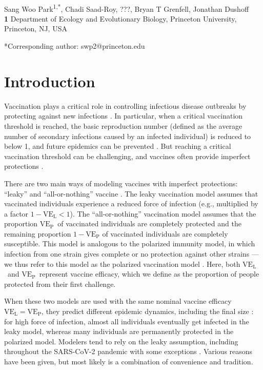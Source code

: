 \documentclass[12pt]{article}
\date{\today}
\newcommand{\VE}{\ensuremath{\mathrm{VE}}}
\newcommand{\VEP}{\ensuremath{\VE_{\mathrm{P}}}}
\newcommand{\VEL}{\ensuremath{\VE_{\mathrm{L}}}}
\begin{document}
\begin{flushleft}{
	\Large
	\textbf{}
}
\newline
\\
Sang Woo Park\textsuperscript{1,*}, Chadi Saad-Roy, ???, Bryan T Grenfell, Jonathan Dushoff
\\
\bigskip
\textbf{1} Department of Ecology and Evolutionary Biology, Princeton University, Princeton, NJ, USA
\\
\bigskip

*Corresponding author: swp2@princeton.edu
\end{flushleft}

\section*{Introduction}

Vaccination plays a critical role in controlling infectious disease outbreaks by protecting against new infections \citep{iwasaki2020and}.
In particular, when a critical vaccination threshold is reached, the basic reproduction number (defined as the average number of secondary infections caused by an infected individual) is reduced to below 1, and future epidemics can be prevented \citep{anderson1985vaccination}.
But reaching a critical vaccination threshold can be challenging, and vaccines often provide imperfect protections \citep{gandon2003imperfect,anderson2020challenges}.

There are two main ways of modeling vaccines with imperfect protections: ``leaky'' and ``all-or-nothing'' vaccine \citep{smith1984assessment}.
The leaky vaccination model assumes that vaccinated individuals experience a reduced force of infection (e.g., multiplied by a factor $1-\VEL < 1$).
The ``all-or-nothing'' vaccination model assumes that the proportion \VEP\ of vaccinated individuals are completely protected and the remaining proportion $1-\VEP$ of vaccinated individuals are completely susceptible.
This model is analogous to the polarized immunity model, in which infection from one strain gives complete or no protection against other strains \citep{gog2002dynamics}---we thus refer to this model as the polarized vaccination model \citep{gomes2014missing}.
Here, both \VEL\ and \VEP\ represent vaccine efficacy, which we define as the proportion of people protected from their first challenge.

When these two models are used with the same nominal vaccine efficacy $\VEL = \VEP$, they predict different epidemic dynamics, including the final size \citep{smith1984assessment}:
for high force of infection, almost all individuals eventually get infected in the leaky model, whereas many individuals are permanently protected in the polarized model.
Modelers tend to rely on the leaky assumption, including throughout the SARS-CoV-2 pandemic \citep{dyson2021possible,gozzi2021importance,marziano2021vaccine,matrajt2021vaccine,park2022intermediate} with some exceptions \citep{bubar2021model,buckner2021dynamic}.
Various reasons have been given, but most likely is a combination of convenience and tradition.
\end{document}
